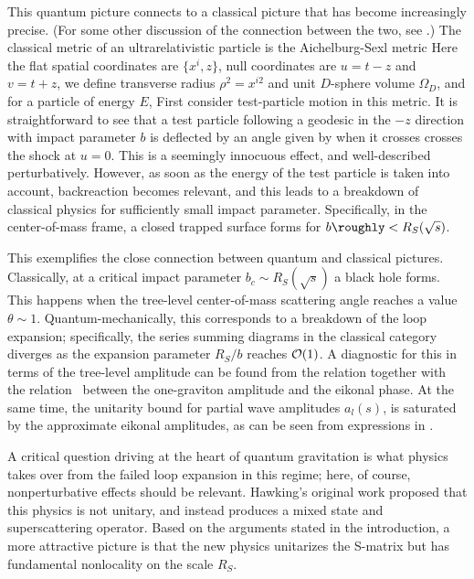 This quantum picture connects to a classical picture that has become increasingly precise.  (For some other discussion of the connection between the two, see .)  The classical metric of an ultrarelativistic particle is the Aichelburg-Sexl metric
%
\eqn{}
%
Here the flat spatial coordinates are $\{x^i, z\}$, null coordinates are $u=t-z$ and $v=t+z$, we define transverse radius $\rho^2=x^{i2}$ and unit $D$-sphere volume $\Omega_D$, and for a particle of energy $E$,
%
\eqn{}
%
First consider test-particle motion in this metric.  It is straightforward to see that a test particle following a geodesic in the $-z$ direction with impact parameter $b$ is deflected by an angle given by
%
\eqn{}
%
when it crosses crosses the shock at $u=0$.  This is a seemingly innocuous effect, and well-described perturbatively.  However, as soon as the energy of the test particle is taken into account, backreaction becomes relevant, and this leads to a breakdown of classical physics for sufficiently small impact parameter.  Specifically, in the center-of-mass frame, a closed trapped surface forms for $b\roughly<R_S(\sqrt s)$.  

This exemplifies the close connection between quantum and classical pictures.  Classically, at a critical impact parameter $b_c\sim R_S(\sqrt s)$ a black hole forms.  This happens when the tree-level center-of-mass scattering angle reaches a value $\theta\sim 1$.  Quantum-mechanically, this corresponds to a breakdown of the loop expansion; specifically, the series summing diagrams in the classical category diverges as the expansion parameter $R_S/b$ reaches ${\cal O}(1)$.  A diagnostic for this in terms of the tree-level amplitude can be found from the relation
%
\eqn{}
%
together with the relation \eiktree\ between the one-graviton amplitude and the eikonal phase.
At the same time, the unitarity bound for partial wave amplitudes $a_l(s)$,
%
\eqn{}
%
is saturated by the approximate eikonal amplitudes, as can be seen from expressions in .

A critical question driving at the heart of quantum gravitation is what physics takes over from the failed loop expansion in this regime; here, of course, nonperturbative effects should be relevant.  Hawking's original work  proposed that this physics is not unitary, and instead produces a mixed state and superscattering operator.  Based on the arguments stated in the introduction, a more attractive picture is that the new physics unitarizes the S-matrix but has fundamental nonlocality on the scale $R_S$.  

